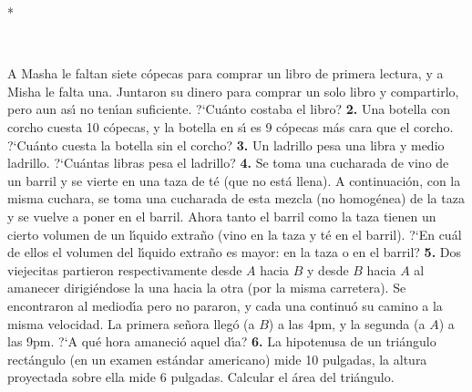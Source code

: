 \documentclass[12pt]{article}  %
\begin{document}
\vspace{0pt plus 12pt}
\centerline{*\quad *\quad*}
\vspace{.4\baselineskip}

\

{} A Masha le faltan siete c\'opecas para comprar un libro de primera lectura, y a Misha le falta una.
Juntaron su dinero para comprar un solo libro y compartirlo, pero aun as\'{\i} no ten\'{\i}an suficiente.
?`Cu\'anto costaba el libro?
\newline\newline
{\bf 2.} Una botella con corcho cuesta 10 c\'opecas, y la botella en s\'{\i} es 9 c\'opecas m\'as cara 
que el corcho. ?`Cu\'anto cuesta la botella sin el corcho?
\newline\newline{}\quad
{\bf 3.} Un ladrillo pesa una libra y medio ladrillo. ?`Cu\'antas libras pesa el ladrillo?
\newline\newline\quad
{\bf 4.} Se toma una cucharada de vino de un barril y se vierte en una taza de t\'e (que no est\'a llena).
A continuaci\'on, con la misma cuchara, se toma una cucharada de esta mezcla (no homog\'enea) de la taza y se vuelve a 
poner en el barril.
Ahora tanto el barril como la taza tienen un cierto volumen de un l\'{\i}quido extra\~no (vino en la taza y t\'e en el
 barril). ?`En cu\'al de ellos el volumen del l\'{\i}quido extra\~no es mayor: en la taza o en el barril?
\newline\newline\quad
{\bf 5.} Dos viejecitas partieron respectivamente desde $A$ hacia $B$ y desde $B$ hacia $A$ al amanecer dirigi\'endose la
 una hacia la otra (por la misma carretera). Se encontraron al mediod\'{\i}a pero no pararon, y cada una continu\'o su 
 camino a la misma velocidad. La primera se\~nora lleg\'o (a $B$) a las 4pm, y la segunda (a $A$) a las 9pm. ?`A qu\'e
  hora amaneci\'o aquel d\'{\i}a? 
\newline\newline\quad
{\bf 6.} La hipotenusa de un tri\'angulo rect\'angulo (en un examen est\'andar americano) mide 10 pulgadas,
la altura proyectada sobre ella mide 6 pulgadas. Calcular el \'area del tri\'angulo.
\end{document}
